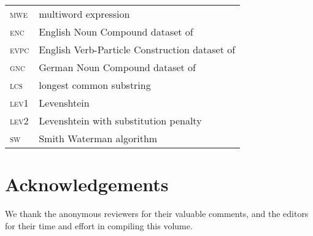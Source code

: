 \documentclass[output=paper,modfonts,nonflat]{langsci/langscibook}
\begin{document}
\begin{tabularx}{.48\textwidth}{ll}
   \textsc{mwe} & multiword expression  \\
  \textsc{enc} &  English Noun Compound dataset of \citet{reddy2011a}  \\
\textsc{evpc} &  English Verb-Particle Construction dataset of \citet{bannard2003}  \\
\textsc{gnc}  &  German Noun Compound dataset of \citet{SchulteImWalde+:2013} \\
 \textsc{lcs} &   longest common substring  \\
  \textsc{lev1} &  Levenshtein  \\
  \textsc{lev2} &  Levenshtein with substitution penalty \\
 \textsc{sw}  & Smith Waterman algorithm  \\
  \end{tabularx}


\section*{Acknowledgements}
We thank the anonymous reviewers for their valuable
comments, and the editors for their time and effort in compiling
this volume.

{\sloppy
\printbibliography[heading=subbibliography,notkeyword=this]
}
\end{document}
